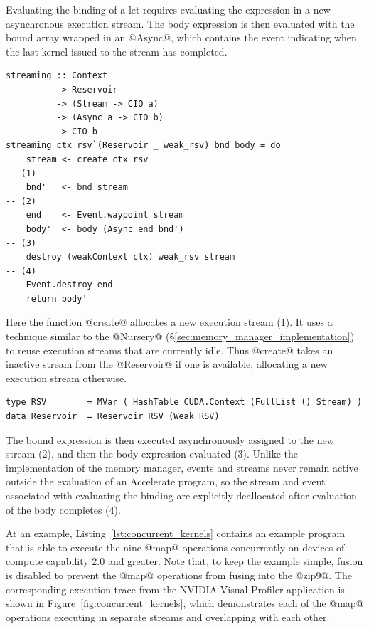 Evaluating the binding of a let requires evaluating the expression in a new
asynchronous execution stream. The body expression is then evaluated with the
bound array wrapped in an @Async@, which contains the event indicating when the
last kernel issued to the stream has completed.
%
\begin{lstlisting}[style=haskell]
streaming :: Context
          -> Reservoir
          -> (Stream -> CIO a)
          -> (Async a -> CIO b)
          -> CIO b
streaming ctx rsv`(Reservoir _ weak_rsv) bnd body = do
    stream <- create ctx rsv                                                       -- (1)
    bnd'   <- bnd stream                                                           -- (2)
    end    <- Event.waypoint stream
    body'  <- body (Async end bnd')                                                -- (3)
    destroy (weakContext ctx) weak_rsv stream                                      -- (4)
    Event.destroy end
    return body'
\end{lstlisting}
%
Here the function @create@ allocates a new execution stream (1). It uses a
technique similar to the @Nursery@ (\S\ref{sec:memory_manager_implementation})
to reuse execution streams that are currently idle. Thus @create@ takes an
inactive stream from the @Reservoir@ if one is available, allocating a new
execution stream otherwise.
%
\begin{lstlisting}[style=haskell]
type RSV        = MVar ( HashTable CUDA.Context (FullList () Stream) )
data Reservoir  = Reservoir RSV (Weak RSV)
\end{lstlisting}
%
The bound expression is then executed asynchronously assigned to the new stream
(2), and then the body expression evaluated (3). Unlike the implementation of
the memory manager, events and streams never remain active outside the
evaluation of an Accelerate program, so the stream and event associated with
evaluating the binding are explicitly deallocated after evaluation of the body
completes (4).

At an example, Listing~\ref{lst:concurrent_kernels} contains an example program
that is able to execute the nine @map@ operations concurrently on devices of
compute capability 2.0 and greater. Note that, to keep the example simple,
fusion is disabled to prevent the @map@ operations from fusing into the @zip9@.
The corresponding execution trace from the NVIDIA Visual Profiler application is
shown in Figure~\ref{fig:concurrent_kernels}, which demonstrates each of the
@map@ operations executing in separate streams and overlapping with each other.

